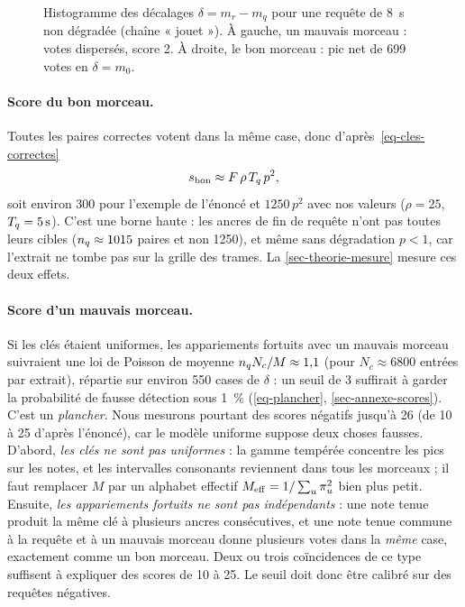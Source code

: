 \begin{figure}[t]
  \centering
  \caption{Histogramme des décalages $\delta = m_r - m_q$ pour une requête de
  \qty{8}{\second} non dégradée (chaîne « jouet »). À gauche, un mauvais morceau : votes
  dispersés, score 2. À droite, le bon morceau : pic net de 699 votes en $\delta = m_0$.}
  \label{fig-histo-delta}
\end{figure}

\paragraph{Score du bon morceau.} Toutes les paires correctes votent dans la même case,
donc d'après~\eqref{eq-cles-correctes}
\begin{equation}
  s_{\text{bon}} \approx F\,\rho\,T_q\,p^2 ,
  \label{eq-score-bon}
\end{equation}
soit environ 300 pour l'exemple de l'énoncé et $1250\,p^2$ avec nos valeurs
($\rho = 25$, $T_q = \qty{5}{\second}$). C'est une borne haute : les ancres de fin de requête
n'ont pas toutes leurs cibles ($n_q \approx \num{1015}$ paires et non \num{1250}), et même sans
dégradation $p < 1$, car l'extrait ne tombe pas sur la grille des trames. La
\cref{sec-theorie-mesure} mesure ces deux effets.

\paragraph{Score d'un mauvais morceau.} Si les clés étaient uniformes, les appariements
fortuits avec un mauvais morceau suivraient une loi de Poisson de moyenne
$n_q N_c/M \approx \num{1.1}$ (pour $N_c \approx \num{6800}$ entrées par extrait), répartie
sur environ 550 cases de $\delta$ : un seuil de 3 suffirait à garder la probabilité de fausse
détection sous \qty{1}{\percent} (\cref{eq-plancher}, \cref{sec-annexe-scores}). C'est un
\emph{plancher}. Nous mesurons pourtant des scores négatifs jusqu'à 26 (de 10 à 25 d'après
l'énoncé), car le modèle uniforme suppose deux choses fausses. D'abord, \emph{les clés ne
sont pas uniformes} : la gamme tempérée concentre les pics sur les notes, et les intervalles
consonants reviennent dans tous les morceaux ; il faut remplacer $M$ par un alphabet effectif
$M_{\mathrm{eff}} = 1/\sum_u \pi_u^2$ bien plus petit. Ensuite, \emph{les appariements fortuits ne sont
pas indépendants} : une note tenue produit la même clé à plusieurs ancres consécutives, et une
note tenue commune à la requête et à un mauvais morceau donne plusieurs votes dans la
\emph{même} case, exactement comme un bon morceau. Deux ou trois coïncidences de ce type
suffisent à expliquer des scores de 10 à 25. Le seuil doit donc être calibré sur des
requêtes négatives.

